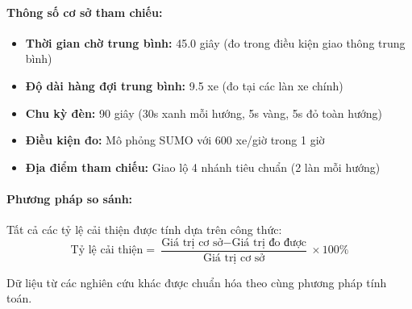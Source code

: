 \paragraph{Thông số cơ sở tham chiếu:}
\begin{itemize}
    \item \textbf{Thời gian chờ trung bình:} 45.0 giây (đo trong điều kiện giao thông trung bình)
    \item \textbf{Độ dài hàng đợi trung bình:} 9.5 xe (đo tại các làn xe chính)
    \item \textbf{Chu kỳ đèn:} 90 giây (30s xanh mỗi hướng, 5s vàng, 5s đỏ toàn hướng)
    \item \textbf{Điều kiện đo:} Mô phỏng SUMO với 600 xe/giờ trong 1 giờ
    \item \textbf{Địa điểm tham chiếu:} Giao lộ 4 nhánh tiêu chuẩn (2 làn mỗi hướng)
\end{itemize}

\paragraph{Phương pháp so sánh:}
Tất cả các tỷ lệ cải thiện được tính dựa trên công thức:
\begin{equation}
\text{Tỷ lệ cải thiện} = \frac{\text{Giá trị cơ sở} - \text{Giá trị đo được}}{\text{Giá trị cơ sở}} \times 100\%
\end{equation}

Dữ liệu từ các nghiên cứu khác được chuẩn hóa theo cùng phương pháp tính toán.

